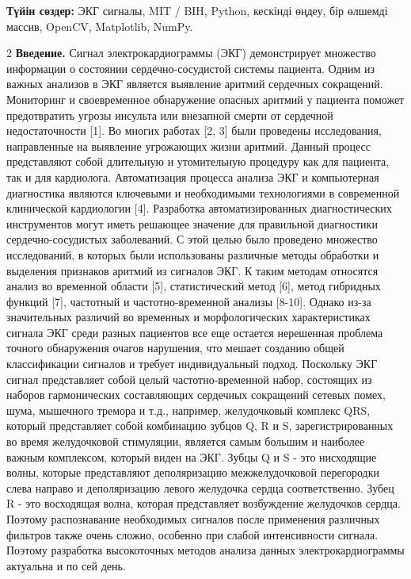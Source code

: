 {\bfseries Түйін сөздер:} ЭКГ сигналы, MIT / BIH, Python, кескінді өңдеу,
бір өлшемді массив, OpenCV, Matplotlib, NumPy.

\begin{multicols}{2}
{\bfseries Введение.} Сигнал электрокардиограммы (ЭКГ) демонстрирует
множество информации о состоянии сердечно-сосудистой системы пациента.
Одним из важных анализов в ЭКГ является выявление аритмий сердечных
сокращений. Мониторинг и своевременное обнаружение опасных аритмий у
пациента поможет предотвратить угрозы инсульта или внезапной смерти от
сердечной недостаточности {[}1{]}. Во многих работах {[}2, 3{]} были
проведены исследования, направленные на выявление угрожающих жизни
аритмий. Данный процесс представляют собой длительную и утомительную
процедуру как для пациента, так и для кардиолога. Автоматизация процесса
анализа ЭКГ и компьютерная диагностика являются ключевыми и необходимыми
технологиями в современной клинической кардиологии {[}4{]}. Разработка
автоматизированных диагностических инструментов могут иметь решающее
значение для правильной диагностики сердечно-сосудистых заболеваний. С
этой целью было проведено множество исследований, в которых были
использованы различные методы обработки и выделения признаков аритмий из
сигналов ЭКГ. К таким методам относятся анализ во временной области
{[}5{]}, статистический метод {[}6{]}, метод гибридных функций {[}7{]},
частотный и частотно-временной анализы {[}8-10{]}. Однако из-за
значительных различий во временных и морфологических характеристиках
сигнала ЭКГ среди разных пациентов все еще остается нерешенная проблема
точного обнаружения очагов нарушения, что мешает созданию общей
классификации сигналов и требует индивидуальный подход. Поскольку ЭКГ
сигнал представляет собой целый частотно-временной набор, состоящих из
наборов гармонических составляющих сердечных сокращений сетевых помех,
шума, мышечного тремора и т.д., например, желудочковый комплекс QRS,
который представляет собой комбинацию зубцов Q, R и S,
зарегистрированных во время желудочковой стимуляции, является самым
большим и наиболее важным комплексом, который виден на ЭКГ. Зубцы Q и S
- это нисходящие волны, которые представляют деполяризацию
межжелудочковой перегородки слева направо и деполяризацию левого
желудочка сердца соответственно. Зубец R - это восходящая волна, которая
представляет возбуждение желудочков сердца. Поэтому распознавание
необходимых сигналов после применения различных фильтров также очень
сложно, особенно при слабой интенсивности сигнала. Поэтому разработка
высокоточных методов анализа данных электрокардиограммы актуальна и по
сей день.


\end{multicols}
